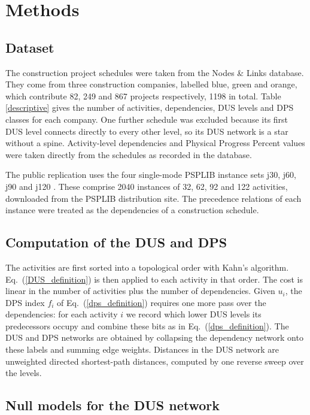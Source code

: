\documentclass[11pt,a4paper]{article}
\begin{document}
\section*{Methods}

\subsection*{Dataset}

The construction project schedules were taken from the Nodes \& Links database. They come from three construction companies, labelled blue, green and orange, which contribute 82, 249 and 867 projects respectively, 1198 in total. Table \ref{descriptive} gives the number of activities, dependencies, DUS levels and DPS classes for each company. One further schedule was excluded because its first DUS level connects directly to every other level, so its DUS network is a star without a spine. Activity-level dependencies and Physical Progress Percent values were taken directly from the schedules as recorded in the database.

The public replication uses the four single-mode PSPLIB instance sets j30, j60, j90 and j120 \cite{kolisch1997psplib}. These comprise 2040 instances of 32, 62, 92 and 122 activities, downloaded from the PSPLIB distribution site. The precedence relations of each instance were treated as the dependencies of a construction schedule.

\subsection*{Computation of the DUS and DPS}

The activities are first sorted into a topological order with Kahn's algorithm. Eq.~(\ref{DUS_definition}) is then applied to each activity in that order. The cost is linear in the number of activities plus the number of dependencies. Given $u_i$, the DPS index $f_i$ of Eq.~(\ref{dps_definition}) requires one more pass over the dependencies: for each activity $i$ we record which lower DUS levels its predecessors occupy and combine these bits as in Eq.~(\ref{dps_definition}). The DUS and DPS networks are obtained by collapsing the dependency network onto these labels and summing edge weights. Distances in the DUS network are unweighted directed shortest-path distances, computed by one reverse sweep over the levels.

\subsection*{Null models for the DUS network}
\end{document}
